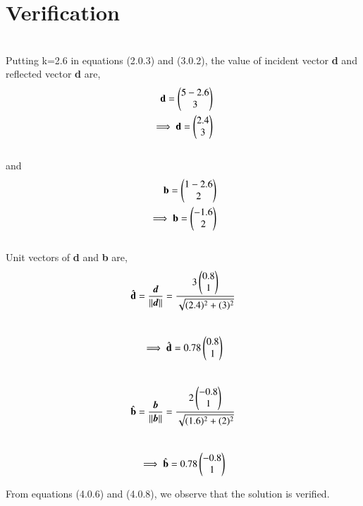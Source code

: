 \documentclass[journal,12pt,twocolumn]{IEEEtran}
\begin{document}
\section{Verification}
\\
Putting k=2.6 in equations (2.0.3) and (3.0.2), the value of incident vector \textbf{d} and reflected vector \textbf{d} are,
\begin{align}
\textbf{d}=\begin{pmatrix}5-2.6 \\ 3\end{pmatrix}\\
\implies \textbf{d}=\begin{pmatrix}2.4\\3\end{pmatrix}
\end{align}\\
and\\
\begin{align}
\textbf{b}=\begin{pmatrix}1-2.6 \\ 2\end{pmatrix}\\
\implies \textbf{b}=\begin{pmatrix}-1.6\\2\end{pmatrix}
\end{align}\\
Unit vectors of \textbf{d} and \textbf{b} are,
\\
\begin{align}
    \hat{\mathbf{d}}=\frac{\bm d}{\left\lVert\bm d\right\rVert}= \frac{3 \begin{pmatrix}0.8\\1\end{pmatrix}}{\sqrt{(2.4)^2+(3)^2}}
    \end{align}\\
    \begin{align}
    \implies \hat{\mathbf{d}}=0.78 \begin{pmatrix}0.8\\1\end{pmatrix}
    \end{align}
    \\
\begin{align}
    \hat{\mathbf{b}}=\frac{\bm b}{\left\lVert\bm b\right\rVert}= \frac{2 \begin{pmatrix}-0.8\\1\end{pmatrix}}{\sqrt{(1.6)^2+(2)^2}}
    \end{align}\\
    \begin{align}
    \implies \hat{\mathbf{b}}=0.78 \begin{pmatrix}-0.8\\1\end{pmatrix}
    \end{align}

    From equations (4.0.6) and (4.0.8), we observe that the solution is verified.\\
\\
\end{document}
